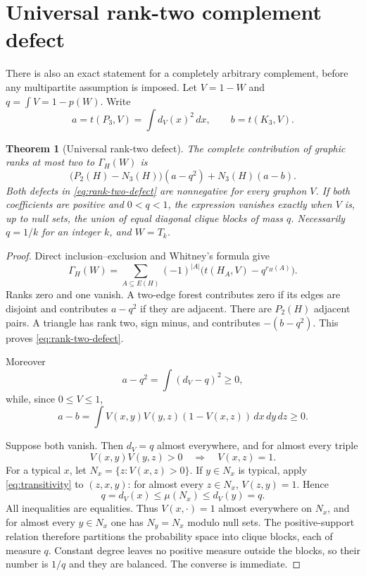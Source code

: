 \documentclass[11pt]{article}
\newtheorem{theorem}{Theorem}[section]
\newcommand{\Gap}{\Gamma_H}
\begin{document}
\section{Universal rank-two complement defect}

There is also an exact statement for a completely arbitrary complement,
before any multipartite assumption is imposed.  Let $V=1-W$ and
$q=\int V=1-p(W)$.  Write
\[
 a=t(P_3,V)=\int d_V(x)^2\,dx,
 \qquad b=t(K_3,V).
\]

\begin{theorem}[Universal rank-two defect]\label{thm:rank-two}
The complete contribution of graphic ranks at most two to $\Gap(W)$ is
\begin{equation}
 \bigl(P_2(H)-N_3(H)\bigr)(a-q^2)+N_3(H)(a-b).
 \label{eq:rank-two-defect}
\end{equation}
Both defects in \eqref{eq:rank-two-defect} are nonnegative for every
graphon $V$.  If both coefficients are positive and $0<q<1$, the expression
vanishes exactly when $V$ is, up to null sets, the union of equal diagonal
clique blocks of mass $q$.  Necessarily $q=1/k$ for an integer $k$, and
$W=T_k$.
\end{theorem}

\begin{proof}
Direct inclusion--exclusion and Whitney's formula give
\[
 \Gap(W)=\sum_{A\subseteq E(H)}(-1)^{|A|}
 \bigl(t(H_A,V)-q^{r_H(A)}\bigr).
\]
Ranks zero and one vanish.  A two-edge forest contributes zero if its edges
are disjoint and contributes $a-q^2$ if they are adjacent.  There are
$P_2(H)$ adjacent pairs.  A triangle has rank two, sign minus, and contributes
$-(b-q^2)$.  This proves \eqref{eq:rank-two-defect}.

Moreover
\[
 a-q^2=\int(d_V-q)^2\geq0,
\]
while, since $0\leq V\leq1$,
\[
 a-b=\int V(x,y)V(y,z)(1-V(x,z))\,dx\,dy\,dz\geq0.
\]

Suppose both vanish.  Then $d_V=q$ almost everywhere, and for almost every
triple
\begin{equation}
 V(x,y)V(y,z)>0\quad\Longrightarrow\quad V(x,z)=1.
 \label{eq:transitivity}
\end{equation}
For a typical $x$, let $N_x=\{z:V(x,z)>0\}$.  If $y\in N_x$ is typical,
apply \eqref{eq:transitivity} to $(z,x,y)$: for almost every $z\in N_x$,
$V(z,y)=1$.  Hence
\[
 q=d_V(x)\leq\mu(N_x)\leq d_V(y)=q.
\]
All inequalities are equalities.  Thus $V(x,\cdot)=1$ almost everywhere on
$N_x$, and for almost every $y\in N_x$ one has $N_y=N_x$ modulo null sets.
The positive-support relation therefore partitions the probability space
into clique blocks, each of measure $q$.  Constant degree leaves no positive
measure outside the blocks, so their number is $1/q$ and they are balanced.
The converse is immediate.
\end{proof}
\end{document}
